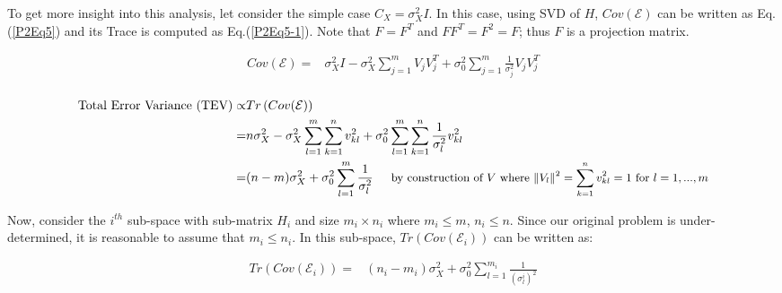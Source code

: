To get more insight into this analysis, let consider the simple case $C_{X}=\sigma^{2}_{X}I$. In this case, using SVD of $H$, $Cov(\mathcal{E})$ can be written as Eq.(\ref{P2Eq5}) and its Trace is computed as Eq.(\ref{P2Eq5-1}). Note that $F=F^{T}$ and $FF^{T}=F^{2}=F$; thus $F$ is a projection matrix.

\begin{equation}\label{P2Eq5}
\begin{aligned}
Cov(\mathcal{E}) = & \sigma^{2}_{X} I - \sigma^{2}_{X} \sum_{j=1}^{m} V_{j}V_{j}^{T} + \sigma^{2}_{0} \sum_{j=1}^{m} \frac{1}{\sigma^{2}_{j}} V_{j}V_{j}^{T} \\ 
\end{aligned}
\end{equation}

\begin{equation}\label{P2Eq5-1}
\begin{aligned}
\text{Total Error Variance (TEV)} \propto & Tr\left(Cov(\mathcal{E})\right) \\
                           = & n\sigma^{2}_{X} - \sigma^{2}_{X} \sum_{l=1}^{m} \sum_{k=1}^{n} v^{2}_{kl} + \sigma^{2}_{0} \sum_{l=1}^{m} \sum_{k=1}^{n} \frac{1}{\sigma^{2}_{l}}  v^{2}_{kl} \\
 = & (n-m) \sigma^{2}_{X} + \sigma^{2}_{0} \sum_{l=1}^{m} \frac{1}{\sigma^{2}_{l}} \hspace{0.5cm} \small{\text{by construction of $V$ where $\left\|V_{l}\right\|^{2}=\sum_{k=1}^{n} v^{2}_{kl}=1$ for $l=1,...,m$}} \\
\end{aligned}
\end{equation}

Now, consider the $i^{th}$ sub-space with sub-matrix $H_{i}$ and size $m_{i}\times n_{i}$ where $m_{i}\leq m$, $n_{i}\leq n$. Since our original problem is under-determined, it is reasonable to assume that $m_{i}\leq n_{i}$. In this sub-space, $Tr\left(Cov(\mathcal{E}_{i})\right)$ can be written as:

\begin{equation}\label{P2Eq5-2}
\begin{aligned}
Tr\left(Cov(\mathcal{E}_{i})\right) = & (n_{i}-m_{i}) \sigma^{2}_{X} + \sigma^{2}_{0} \sum_{l=1}^{m_{i}} \frac{1}{\left(\sigma^{i}_{l}\right)^{2}}
\end{aligned}
\end{equation}

